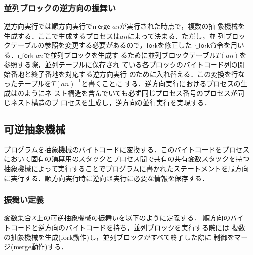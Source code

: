 \documentclass[submit,PRO]{ipsj}
\newcommand{\bcode}[1]{$\mathsf{#1}$}
\begin{document}
\subsubsection{並列ブロックの逆方向の振舞い}

逆方向実行では順方向実行で\bcode{merge} $an$が実行された時点で，複数の抽
象機械を生成する．ここで生成するプロセスは$an$によって決まる．ただし，並
列ブロックテーブルの参照を変更する必要があるので，\bcode{fork}を修正した
\bcode{r\_fork}命令を用いる．\bcode{r\_fork} $an$で並列ブロックを生成す
るために並列ブロックテーブル$T(an)$を参照する際，並列テーブルに保存され
ている各ブロックのバイトコード列の開始番地と終了番地を対応する逆方向実行
のために入れ替える．この変換を行なったテーブルを$T(an)^{-1}$と書くことに
する．逆方向実行におけるプロセスの生成はのようにネ
スト構造を含んでいても必ず同じプロセス番号のプロセスが同じネスト構造のプ
ロセスを生成し，逆方向の並行実行を実現する．


\subsection{可逆抽象機械}
\label{sec:format}

プログラムを抽象機械のバイトコードに変換する．このバイトコードをプロセス
において固有の演算用のスタックとプロセス間で共有の共有変数スタックを持つ
抽象機械によって実行することでプログラムに書かれたステートメントを順方向
に実行する．順方向実行時に逆向き実行に必要な情報を保存する．

\subsubsection{振舞い定義}

変数集合$X$上の可逆抽象機械の振舞いを以下のように定義する．
順方向のバイトコードと逆方向のバイトコードを持ち，並列ブロックを実行する際には
複数の抽象機械を生成(fork動作)し，並列ブロックがすべて終了した際に
制御をマージ(merge動作)する．
\end{document}
